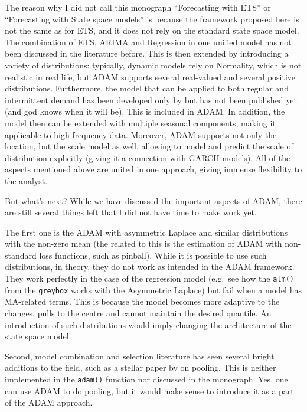 \documentclass[
]{book}
\theoremstyle{definition}
\theoremstyle{definition}
\theoremstyle{definition}
\theoremstyle{definition}
\theoremstyle{remark}
\begin{document}
The reason why I did not call this monograph ``Forecasting with ETS'' or ``Forecasting with State space models'' is because the framework proposed here is not the same as for ETS, and it does not rely on the standard state space model. The combination of ETS, ARIMA and Regression in one unified model has not been discussed in the literature before. This is then extended by introducing a variety of distributions: typically, dynamic models rely on Normality, which is not realistic in real life, but ADAM supports several real-valued and several positive distributions. Furthermore, the model that can be applied to both regular and intermittent demand has been developed only by \citet{Svetunkov2019a} but has not been published yet (and god knows when it will be). This is included in ADAM. In addition, the model then can be extended with multiple seasonal components, making it applicable to high-frequency data. Moreover, ADAM supports not only the location, but the scale model as well, allowing to model and predict the scale of distribution explicitly (giving it a connection with GARCH models). All of the aspects mentioned above are united in one approach, giving immense flexibility to the analyst.

But what's next? While we have discussed the important aspects of ADAM, there are still several things left that I did not have time to make work yet.

The first one is the ADAM with asymmetric Laplace and similar distributions with the non-zero mean (the related to this is the estimation of ADAM with non-standard loss functions, such as pinball). While it is possible to use such distributions, in theory, they do not work as intended in the ADAM framework. They work perfectly in the case of the regression model (e.g.~see how the \texttt{alm()} from the \texttt{greybox} works with the Asymmetric Laplace) but fail when a model has MA-related terms. This is because the model becomes more adaptive to the changes, pulls to the centre and cannot maintain the desired quantile. An introduction of such distributions would imply changing the architecture of the state space model.

Second, model combination and selection literature has seen several bright additions to the field, such as a stellar paper by \citet{Kourentzes2019c} on pooling. This is neither implemented in the \texttt{adam()} function nor discussed in the monograph. Yes, one can use ADAM to do pooling, but it would make sense to introduce it as a part of the ADAM approach.
\end{document}
